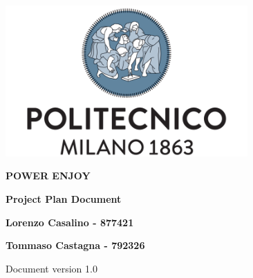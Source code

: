 \begin{titlepage}
        \begin{center}
                \includegraphics[width=350px]{../Datas/images/polimi.png}

                \vspace*{2.0cm}

                {\Huge \textbf{POWER ENJOY}\par}

                \vspace*{1.0cm}

                {\LARGE \textbf{Project Plan Document}\par}

                \vspace*{2.0cm}

                {\normalsize
                \textbf{Lorenzo Casalino - 877421}\par
                \textbf{Tommaso Castagna - 792326}\par
                }

                \vfill
                Document version 1.0
        \end{center}
\end{titlepage}
